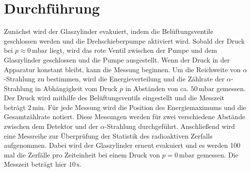 \section{Durchführung}
\label{sec:Durchführung}
Zunächst wird der Glaszylinder evakuiert, indem die Belüftungsventile geschlossen werden und die Drehschieberpumpe aktiviert 
wird. Sobald der Druck bei $p \approx 0\,\unit{\milli\bar}$ liegt, wird das rote Ventil zwischen der Pumpe und dem Glaszylinder 
geschlossen und die Pumpe ausgestellt. Wenn der Druck in der Apparatur konstant bleibt, kann die Messung beginnen. Um die Reichweite 
von $\alpha$-Strahlung zu bestimmen, wird die Energieverteilung und die Zählrate der $\alpha$-Strahlung in Abhängigkeit vom Druck $p$ 
in Abständen von ca. $50\,\unit{\milli\bar}$ gemessen. Der Druck wird mithilfe des Belüftungsventils eingestellt und die Messzeit beträgt $2\,\unit{\minute}$. 
Für jede Messung wird die Position des Energiemaximums und die Gesamtzählrate notiert. 
Diese Messungen werden für zwei verschiedene Abstände zwischen dem Detektor und der $\alpha$-Strahlung durchgeführt. Anschließend wird 
eine Messreihe zur Überprüfung der Statistik des radioaktiven Zerfalls aufgenommen. Dabei wird der Glaszylinder erneut evakuiert und es 
werden 100 mal die Zerfälle pro Zeiteinheit bei einem Druck von $p = 0\,\unit{\milli\bar}$ gemessen. Die Messzeit beträgt hier $10\,\unit{\second}$.
